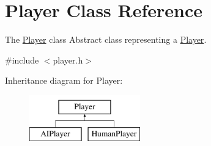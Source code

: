 \hypertarget{class_player}{\section{Player Class Reference}
\label{class_player}
}


The \hyperlink{class_player}{Player} class Abstract class representing a \hyperlink{class_player}{Player}.  




{\ttfamily \#include $<$player.\-h$>$}

Inheritance diagram for Player\-:\begin{figure}[H]
\begin{center}
\leavevmode
\includegraphics[height=2.000000cm]{class_player}
\end{center}
\end{figure}
